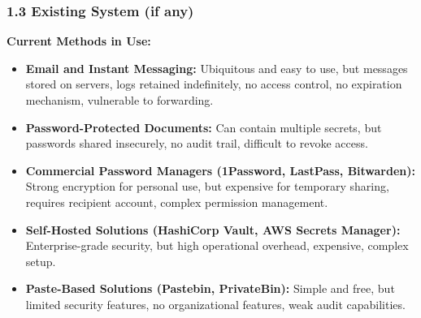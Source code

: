 \documentclass[12pt,a4paper]{article}
\begin{document}
\subsubsection*{1.3 Existing System (if any)}

\textbf{Current Methods in Use:}
\begin{itemize}[leftmargin=*]
  \item \textbf{Email and Instant Messaging:} Ubiquitous and easy to use, but messages stored on servers, logs retained indefinitely, no access control, no expiration mechanism, vulnerable to forwarding.
  \item \textbf{Password-Protected Documents:} Can contain multiple secrets, but passwords shared insecurely, no audit trail, difficult to revoke access.
  \item \textbf{Commercial Password Managers (1Password, LastPass, Bitwarden):} Strong encryption for personal use, but expensive for temporary sharing, requires recipient account, complex permission management.
  \item \textbf{Self-Hosted Solutions (HashiCorp Vault, AWS Secrets Manager):} Enterprise-grade security, but high operational overhead, expensive, complex setup.
  \item \textbf{Paste-Based Solutions (Pastebin, PrivateBin):} Simple and free, but limited security features, no organizational features, weak audit capabilities.
\end{itemize}
\end{document}
